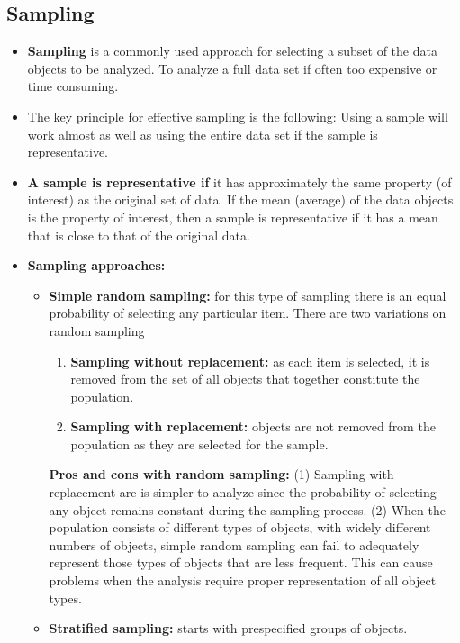 	\subsection*{Sampling}
		\begin{itemize}
			\item {\bf Sampling} is a commonly used approach for selecting a subset of the data 
			objects to be analyzed. To analyze a full data set if often too expensive or 
			time consuming. 
			\item The key principle for effective sampling is the following: Using a sample
			will work almost as well as using the entire data set if the sample is 
			representative.
			\item {\bf A sample is representative if} it has approximately the same property 
			(of interest) as the original set of data. If the mean (average) of the data
			objects is the property of interest, then a sample is representative if it has
			a mean that is close to that of the original data. 
			\item {\bf Sampling approaches:}
				\begin{itemize}
					\item {\bf Simple random sampling: } for this type of sampling there is 
					an equal probability of selecting any particular item. There are two 
					variations on random sampling
						\begin{enumerate}
							\item {\bf Sampling without replacement:} as each item is selected, it is
							removed from the set of all objects that together constitute the
							population. 
							\item {\bf Sampling with replacement:} objects are not removed from 
							the population as they are selected for the sample. 
						\end{enumerate}
					{\bf Pros and cons with random sampling:}  
					(1) Sampling with replacement are is simpler to analyze since the probability 
					of selecting any object remains constant during the sampling process. 
					(2) When the population consists of different types of objects, with widely
					different numbers of objects, simple random sampling can fail to adequately
					represent those types of objects that are less frequent. This can cause
					problems when the analysis require proper representation of all object types.
					\item {\bf Stratified sampling:} starts with prespecified groups of objects.
						\begin{enumerate}

\end{enumerate}
\end{itemize}
\end{itemize}

